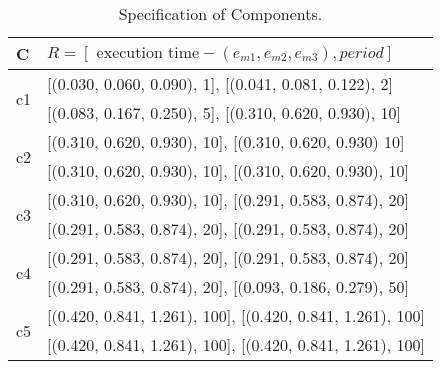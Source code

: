 \begin{table}[h]
\centering
\begin{tabular}{@{}p{0.25cm}l@{}}
\toprule
C  & $R=[\text{ execution time}-(e_{m1}, e_{m2}, e_{m3}), period]$ \\ \midrule
\multirow{2}{4em}{c1} 
& [(0.030, 0.060, 0.090), 1], [(0.041, 0.081, 0.122), 2]\\
&[(0.083, 0.167, 0.250), 5], [(0.310, 0.620, 0.930), 10] \\[0.3em]
\multirow{2}{4em}{c2} 
& [(0.310, 0.620, 0.930), 10], [(0.310, 0.620, 0.930) 10]\\
&[(0.310, 0.620, 0.930), 10], [(0.310, 0.620, 0.930), 10]  \\[0.3em]
\multirow{2}{4em}{c3} 
& [(0.310, 0.620, 0.930), 10], [(0.291, 0.583, 0.874), 20]\\
& [(0.291, 0.583, 0.874), 20], [(0.291, 0.583, 0.874), 20]\\[0.3em]
\multirow{2}{4em}{c4} 
& [(0.291, 0.583, 0.874), 20], [(0.291, 0.583, 0.874), 20]\\
& [(0.291, 0.583, 0.874), 20], [(0.093, 0.186, 0.279), 50]\\[0.3em]
\multirow{2}{4em}{c5}  
& [(0.420, 0.841, 1.261), 100], [(0.420, 0.841, 1.261), 100]\\
& [(0.420, 0.841, 1.261), 100], [(0.420, 0.841, 1.261), 100]\\[0.3em]
\bottomrule
\end{tabular}
\caption{Specification of Components.}
\label{tbl_comps_config}
\end{table}

